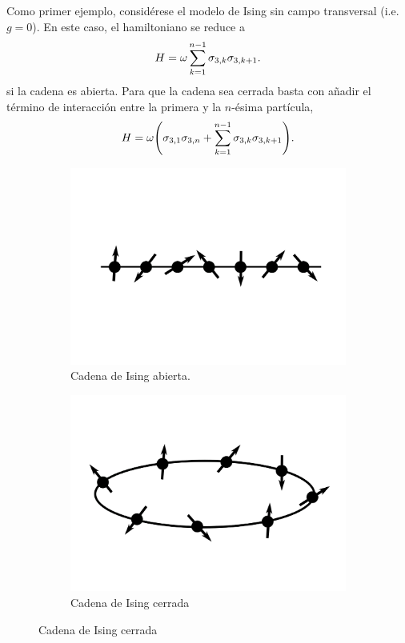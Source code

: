 Como primer ejemplo, considérese el modelo de Ising sin campo transversal (i.e. $g=0$). En este caso, el hamiltoniano se reduce a
\begin{equation}
    H=\omega\sum_{k=1}^{n-1}\sigma_{3,k}\sigma_{3,k+1}.\nonumber
\end{equation}
si la cadena es abierta. Para que la cadena sea cerrada basta con añadir el término de interacción entre la primera y la $n$-ésima partícula,
\begin{equation}
    H=\omega\qty(\sigma_{3,1}\sigma_{3,n}+\sum_{k=1}^{n-1}\sigma_{3,k}\sigma_{3,k+1}).\nonumber
\end{equation}
\begin{figure}[ht!]
    \centering
    \begin{subfigure}{0.5\textwidth}
      \centering
      \includegraphics[width=0.7\linewidth]{chapter3/figures_special/OpenIsing.png}
      \caption{Cadena de Ising abierta.}
    \end{subfigure}%
    \begin{subfigure}{0.5\textwidth}
      \centering
      \includegraphics[width=0.7\linewidth]{chapter3/figures_special/ClosedIsing.png}
      \caption{Cadena de Ising cerrada}
    \end{subfigure}
    \label{fig:IsingChainOpenAndClosed}
\end{figure}
